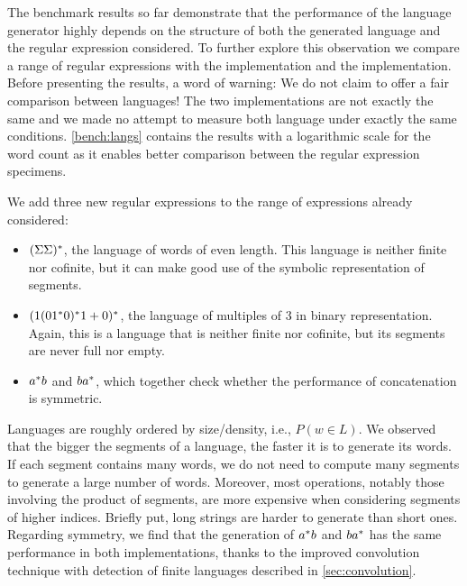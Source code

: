 The benchmark results so far demonstrate that the performance of the language
generator highly depends on the structure of both
the generated language and the regular expression considered.
To further explore this observation we compare a range of regular expressions
with the  \haskell implementation and the 
\ocaml implementation.
Before presenting the results, a word of warning:
We do not claim to offer a fair comparison between languages!
The two implementations are not exactly the same and we made no attempt
to measure both language under exactly the same conditions.
%
\cref{bench:langs} contains the results with a
logarithmic scale for the word count as it enables better comparison
between the regular expression specimens.

We add three new regular expressions to the range of expressions already considered:
\begin{itemize}
\item $(\Sigma\Sigma)^*$, the language of words of even
  length. This language is neither finite nor cofinite, but it can make
  good use of the symbolic representation of segments.
\item $(1 (01^*0)^*1 +{0})^*$, the language
  of multiples of 3 in binary representation. Again, this is a language that is neither
  finite nor cofinite, but its segments are never full nor empty.
\item $a^*b$ and $ba^*$, which together check whether
  the performance of {concatenation} is symmetric.
\end{itemize}

Languages are roughly ordered by size/density, i.e., $P (w\in L)$. We
observed that the bigger the segments of a language, the faster it is
to generate its words.  If each segment contains many words, we do not
need to compute many segments to generate a large number of words.
Moreover, most operations, notably those involving the product of
segments, are more expensive when considering segments of higher
indices. Briefly put, long strings are harder to generate than short
ones.
%
Regarding symmetry, we find that the generation of $a^*b$ and
$ba^*$ has the same performance in both implementations,
thanks to the improved convolution technique
with detection of finite languages described in \cref{sec:convolution}.



